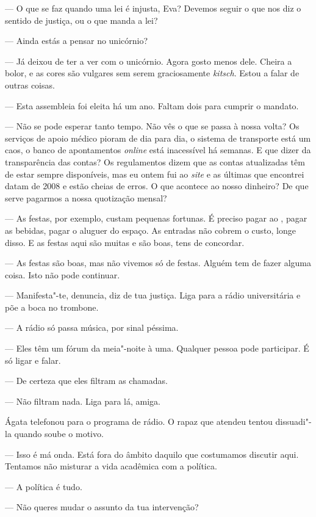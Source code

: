 --- O que se faz quando uma lei é injusta, Eva? Devemos seguir o que nos
  diz o sentido de justiça, ou o que manda a lei?

--- Ainda estás a pensar no unicórnio?

--- Já deixou de ter a ver com o unicórnio. Agora gosto menos dele. Cheira
  a bolor, e as cores são vulgares sem serem graciosamente
  \emph{kitsch}. Estou a falar de outras coisas.

--- Esta assembleia foi eleita há um ano. Faltam dois para cumprir o
  mandato.

--- Não se pode esperar tanto tempo. Não vês o que se passa à nossa volta?
  Os serviços de apoio médico pioram de dia para dia, o sistema de
  transporte está um caos, o banco de apontamentos \emph{online }está
  inacessível há semanas. E que dizer da transparência das contas? Os
  regulamentos dizem que as contas atualizadas têm de estar sempre
  disponíveis, mas eu ontem fui ao \emph{site }e as últimas que
  encontrei datam de 2008 e estão cheias de erros. O que acontece ao
  nosso dinheiro? De que serve pagarmos a nossa quotização mensal?

--- As festas, por exemplo, custam pequenas fortunas. É preciso pagar ao
  , pagar as bebidas, pagar o aluguer do espaço. As entradas não
  cobrem o custo, longe disso. E as festas aqui são muitas e são boas,
  tens de concordar.

--- As festas são boas, mas não vivemos só de festas. Alguém tem de
  fazer alguma coisa. Isto não pode continuar.

--- Manifesta"-te, denuncia, diz de tua justiça. Liga para a rádio
  universitária e põe a boca no trombone.

--- A rádio só passa música, por sinal péssima.

--- Eles têm um fórum da meia"-noite à uma. Qualquer pessoa pode
  participar. É só ligar e falar.

--- De certeza que eles filtram as chamadas.

--- Não filtram nada. Liga para lá, amiga.

Ágata telefonou para o programa de rádio. O rapaz que atendeu tentou
dissuadi"-la quando soube o motivo.

--- Isso é má onda. Está fora do âmbito daquilo que costumamos discutir
  aqui. Tentamos não misturar a vida acadêmica com a política.

--- A política é tudo.

--- Não queres mudar o assunto da tua intervenção?

